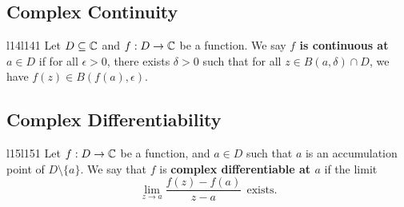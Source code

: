\documentclass[a4paper]{article}
\begin{document}
\subsection*{Complex Continuity}

\begin{ocg}{l14}{l14}{1}
    Let \( D \subseteq \mathbb{C}   \) and \( f: D \to \mathbb{C}  \) be a function. We say \textbf{\( f  \) is continuous at \( a \in D  \)} if for all \( \epsilon > 0  \), there exists \( \delta > 0  \) such that for all \( z \in B(a,\delta) \cap D \), we have \( f(z) \in B(f(a), \epsilon) \).
\end{ocg}
\newline
{}

\subsection*{Complex Differentiability}

\begin{ocg}{l15}{l15}{1}
    Let \( f: D \to \mathbb{C}  \) be a function, and \(a \in D  \) such that \( a  \) is an accumulation point of \( D \setminus  \{ a \}  \). We say that \( f  \) is \textbf{complex differentiable at \( a  \)} if the limit 
    \[  \lim_{ z \to a } \frac{ f(z) - f(a)  }{  z - a  } \ \ \text{exists}.  \]
\end{ocg}
\newline
{}
\end{document}
